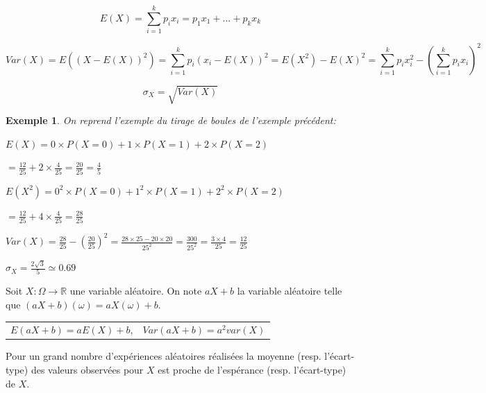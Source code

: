 \documentclass[a4paper,11pt]{article}
\theoremstyle{break}
\newcounter{enonce}
\newtheorem{exemple}[enonce]{Exemple}
\begin{document}
  \begin{definition} 
    
   $$E(X)=\sum_{i=1}^k p_i x_i=p_1 x_1+...+p_k x_k$$
   
   $$Var(X)=E((X-E(X))^2)=\sum_{i=1}^k p_i (x_i-E(X))^2=E(X^2)-E(X)^2=\sum_{i=1}^k p_i x_i^2-(\sum_{i=1}^k p_i x_i)^2$$
   
   $$\sigma_X=\sqrt{Var(X)}$$
   \end{definition}
   
     \begin{exemple}
    
    On reprend l'exemple du tirage de boules de l'exemple précédent:
    
    $E(X)=0 \times P(X=0)+1 \times P(X=1)+2 \times P(X=2)$
    
    $=\frac{12}{25}+2 \times \frac{4}{25}=\frac{20}{25}
    =\frac{4}{5}$
    
    $E(X^2)=0^2 \times P(X=0)+1^2 \times P(X=1)+2^2 \times P(X=2)$
    
    $=\frac{12}{25}+4 \times \frac{4}{25}=\frac{28}{25}$
    
    $Var(X)=\frac{28}{25}-(\frac{20}{25})^2=\frac{28\times 25- 20 \times 20}{25^2}=\frac{300}{25^2}
    =\frac{3\times 4}{25}=\frac{12}{25}$
    
    $\sigma_X=\frac{2\sqrt{3}}{5}\simeq 0.69$
   \end{exemple}

     \begin{theorem}
    Soit $X:\Omega \to \mathbb{R}$ une variable aléatoire. On note $aX+b$ la variable aléatoire
     telle que $(aX+b)(\omega)=aX(\omega)+b$.
     
      \begin{centering}
      \begin{tabular}{c c}
   $E(aX+b)=aE(X)+b$,& $Var(aX+b)=a^2 var(X)$ 
   \end{tabular}

   \end{centering}
     
   \end{theorem}
   
      \begin{theorem}
    
    Pour un grand nombre d'expériences aléatoires réalisées la moyenne (resp. l'écart-type)
    des valeurs observées pour $X$ est proche de l'espérance (resp. l'écart-type) de $X$.
    
   \end{theorem}
   
\end{document}
